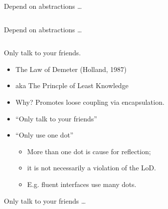 \documentclass{beamer}
\begin{document}
\begin{frame}{Depend on abstractions \ldots}
    \vspace{0cm}
    \begin{columns}
        \column{\dimexpr\paperwidth-40pt}
        
    \end{columns}
\end{frame}

\begin{frame}{Depend on abstractions \ldots}
    \vspace{0cm}
    \begin{columns}
        \column{\dimexpr\paperwidth-40pt}
        
    \end{columns}
\end{frame}

\begin{frame}{Only talk to your friends.}
    \begin{itemize}
        \item The Law of Demeter (Holland, 1987)
        \item aka The Princple of Least Knowledge
        \item Why? Promotes loose coupling via encapsulation.
        \item ``Only talk to your friends''
        \item ``Only use one dot'' 
            \begin{itemize}
                \item More than one dot is cause for reflection; 
                \item it is not necessarily a violation of the LoD.
                \item E.g. fluent interfaces use many dots.
            \end{itemize}
    \end{itemize}
\end{frame}

\begin{frame}{Only talk to your friends \ldots}
    \vspace{0cm}
    \begin{columns}
        \column{\dimexpr\paperwidth-40pt}
        
    \end{columns}
\end{frame}
\end{document}
